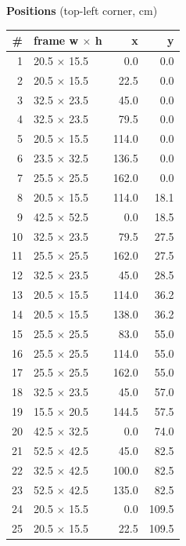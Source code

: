\documentclass[a4paper,landscape,10pt]{article}
\begin{document}
\begin{minipage}[t]{0.25\textwidth}
\vspace{8pt}
{\bfseries Positions} (top-left corner, cm)\\[2pt]
\tiny
\begin{tabular}{@{}r l r r@{}}
\toprule
\# & frame w $\times$ h & x & y \\
\midrule
1 & 20.5 $\times$ 15.5 & 0.0 & 0.0 \\
2 & 20.5 $\times$ 15.5 & 22.5 & 0.0 \\
3 & 32.5 $\times$ 23.5 & 45.0 & 0.0 \\
4 & 32.5 $\times$ 23.5 & 79.5 & 0.0 \\
5 & 20.5 $\times$ 15.5 & 114.0 & 0.0 \\
6 & 23.5 $\times$ 32.5 & 136.5 & 0.0 \\
7 & 25.5 $\times$ 25.5 & 162.0 & 0.0 \\
8 & 20.5 $\times$ 15.5 & 114.0 & 18.1 \\
9 & 42.5 $\times$ 52.5 & 0.0 & 18.5 \\
10 & 32.5 $\times$ 23.5 & 79.5 & 27.5 \\
11 & 25.5 $\times$ 25.5 & 162.0 & 27.5 \\
12 & 32.5 $\times$ 23.5 & 45.0 & 28.5 \\
13 & 20.5 $\times$ 15.5 & 114.0 & 36.2 \\
14 & 20.5 $\times$ 15.5 & 138.0 & 36.2 \\
15 & 25.5 $\times$ 25.5 & 83.0 & 55.0 \\
16 & 25.5 $\times$ 25.5 & 114.0 & 55.0 \\
17 & 25.5 $\times$ 25.5 & 162.0 & 55.0 \\
18 & 32.5 $\times$ 23.5 & 45.0 & 57.0 \\
19 & 15.5 $\times$ 20.5 & 144.5 & 57.5 \\
20 & 42.5 $\times$ 32.5 & 0.0 & 74.0 \\
21 & 52.5 $\times$ 42.5 & 45.0 & 82.5 \\
22 & 32.5 $\times$ 42.5 & 100.0 & 82.5 \\
23 & 52.5 $\times$ 42.5 & 135.0 & 82.5 \\
24 & 20.5 $\times$ 15.5 & 0.0 & 109.5 \\
25 & 20.5 $\times$ 15.5 & 22.5 & 109.5 \\
\bottomrule
\end{tabular}
\end{minipage}
\clearpage
\end{document}
